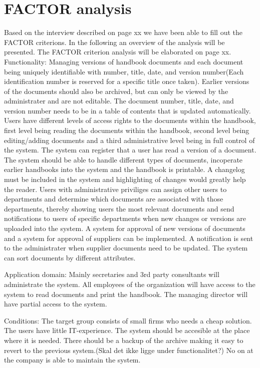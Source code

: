 \section{FACTOR analysis}

Based on the interview described on page xx we have been able to fill out the FACTOR criterions. In the following an overview of the analysis will be presented. The FACTOR criterion analysis will be elaborated on page xx.
Functionality: Managing versions of handbook documents and each document being uniquely identifiable with number, title, date, and version number(Each identification number is reserved for a specific title once taken). Earlier versions of the documents should also be archived, but can only be viewed by the administrater and are not editable.
The document number, title, date, and version number needs to be in a table of contents that is updated automatically.
Users have different levels of access rights to the documents within the handbook, first level being reading the documents within the handbook, second level being editing/adding documents and a third administrative level being in full control of the system.
The system can register that a user has read a version of a document.
The system should be able to handle different types of documents, incoperate earlier handbooks into the system and the handbook is printable.
A changelog must be included in the system and highlighting of changes would greatly help the reader.
Users with administrative priviliges can assign other users to departments and determine which documents are associated with those departments, thereby showing users the most relevant documents and send notifications to users of specific departments when new changes or versions are uploaded into the system.
A system for approval of new versions of documents and a system for approval of suppliers can be implemented.
A notification is sent to the administrater when supplier documents need to be updated. The system can sort documents by different attributes.

Application domain: Mainly secretaries and 3rd party consultants will administrate the system. All employees of the organization will have access to the system to read documents and print the handbook. The managing director will have partial access to the system.

Conditions: The target group consists of small firms who needs a cheap
solution. The users have little IT-experience. The system should be accesible at the place where it is needed.
There should be a backup of the archive making it easy to revert to the previous system.(Skal det ikke ligge under functionalitet?)
No on at the company is able to maintain the system.

